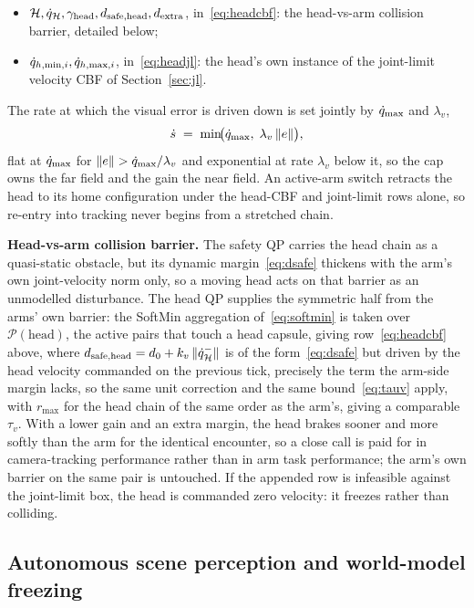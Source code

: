 \begin{itemize}[nosep]
\item $\mathcal{H}, \dot{q}_{\mathcal{H}}, \gamma_{\text{head}}, d_{\text{safe},\text{head}}, d_{\text{extra}}$, in~\eqref{eq:headcbf}: the head-vs-arm collision barrier, detailed below;
\item $\dot{q}_{h,\min,i}, \dot{q}_{h,\max,i}$, in~\eqref{eq:headjl}: the head's own instance of the joint-limit velocity CBF of Section~\ref{sec:jl}.
\end{itemize}
The rate at which the visual error is driven down is set jointly by $\dot{q}_{\max}$ and $\lambda_v$,
\begin{equation}
\dot{s} \;=\; \min\!\bigl(\dot{q}_{\max},\; \lambda_v\,\|e\|\bigr),
\label{eq:headvel}
\end{equation}
flat at $\dot{q}_{\max}$ for $\|e\| > \dot{q}_{\max}/\lambda_v$ and exponential at rate $\lambda_v$ below it, so the cap owns the far field and the gain the near field. An active-arm switch retracts the head to its home configuration under the head-CBF and joint-limit rows alone, so re-entry into tracking never begins from a stretched chain.

\textbf{Head-vs-arm collision barrier.} The safety QP carries the head chain as a quasi-static obstacle, but its dynamic margin~\eqref{eq:dsafe} thickens with the arm's own joint-velocity norm only, so a moving head acts on that barrier as an unmodelled disturbance. The head QP supplies the symmetric half from the arms' own barrier: the SoftMin aggregation of~\eqref{eq:softmin} is taken over $\mathcal{P}(\text{head})$, the active pairs that touch a head capsule, giving row~\eqref{eq:headcbf} above, where $d_{\text{safe},\text{head}} = d_0 + k_v\,\|\dot{q}_{\mathcal{H}}^{-}\|$ is of the form~\eqref{eq:dsafe} but driven by the head velocity commanded on the previous tick, precisely the term the arm-side margin lacks, so the same unit correction and the same bound~\eqref{eq:tauv} apply, with $r_{\max}$ for the head chain of the same order as the arm's, giving a comparable $\tau_v$. With a lower gain and an extra margin, the head brakes sooner and more softly than the arm for the identical encounter, so a close call is paid for in camera-tracking performance rather than in arm task performance; the arm's own barrier on the same pair is untouched. If the appended row is infeasible against the joint-limit box, the head is commanded zero velocity: it freezes rather than colliding.

\subsection{Autonomous scene perception and world-model freezing}
\label{sec:convergence}

